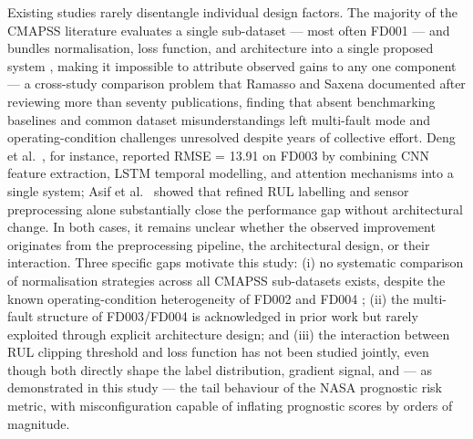 \documentclass[review,12pt]{elsarticle}
\begin{document}
Existing studies rarely disentangle individual design factors. The majority of the CMAPSS literature evaluates a single sub-dataset — most often FD001 — and bundles normalisation, loss function, and architecture into a single proposed system \cite{ref09,ref14,ref15}, making it impossible to attribute observed gains to any one component --- a cross-study comparison problem that Ramasso and Saxena \cite{ref03} documented after reviewing more than seventy publications, finding that absent benchmarking baselines and common dataset misunderstandings left multi-fault mode and operating-condition challenges unresolved despite years of collective effort. Deng et al.~\cite{ref29}, for instance, reported RMSE = 13.91 on FD003 by combining CNN feature extraction, LSTM temporal modelling, and attention mechanisms into a single system; Asif et al.~\cite{ref42} showed that refined RUL labelling and sensor preprocessing alone substantially close the performance gap without architectural change. In both cases, it remains unclear whether the observed improvement originates from the preprocessing pipeline, the architectural design, or their interaction. Three specific gaps motivate this study: (i) no systematic comparison of normalisation strategies across all CMAPSS sub-datasets exists, despite the known operating-condition heterogeneity of FD002 and FD004 \cite{ref24}; (ii) the multi-fault structure of FD003/FD004 is acknowledged in prior work \cite{ref07,ref36} but rarely exploited through explicit architecture design; and (iii) the interaction between RUL clipping threshold and loss function has not been studied jointly, even though both directly shape the label distribution, gradient signal, and — as demonstrated in this study — the tail behaviour of the NASA prognostic risk metric, with misconfiguration capable of inflating prognostic scores by orders of magnitude.
\end{document}
